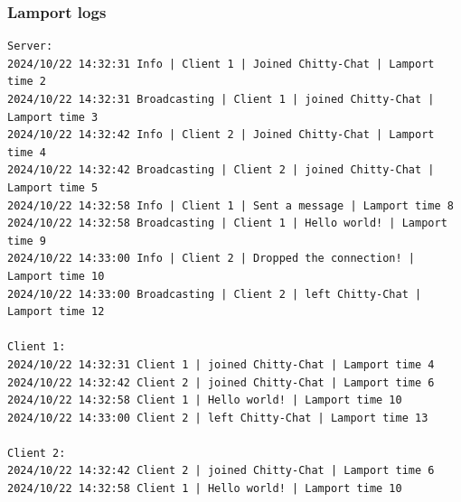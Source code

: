 \documentclass[a4paper,11pt]{article}
\begin{document}
\subsubsection*{Lamport logs}
\begin{lstlisting}[basicstyle=\ttfamily\footnotesize]
Server:
2024/10/22 14:32:31 Info | Client 1 | Joined Chitty-Chat | Lamport time 2
2024/10/22 14:32:31 Broadcasting | Client 1 | joined Chitty-Chat | Lamport time 3
2024/10/22 14:32:42 Info | Client 2 | Joined Chitty-Chat | Lamport time 4
2024/10/22 14:32:42 Broadcasting | Client 2 | joined Chitty-Chat | Lamport time 5
2024/10/22 14:32:58 Info | Client 1 | Sent a message | Lamport time 8
2024/10/22 14:32:58 Broadcasting | Client 1 | Hello world! | Lamport time 9
2024/10/22 14:33:00 Info | Client 2 | Dropped the connection! | Lamport time 10
2024/10/22 14:33:00 Broadcasting | Client 2 | left Chitty-Chat | Lamport time 12

Client 1:
2024/10/22 14:32:31 Client 1 | joined Chitty-Chat | Lamport time 4
2024/10/22 14:32:42 Client 2 | joined Chitty-Chat | Lamport time 6
2024/10/22 14:32:58 Client 1 | Hello world! | Lamport time 10
2024/10/22 14:33:00 Client 2 | left Chitty-Chat | Lamport time 13

Client 2:
2024/10/22 14:32:42 Client 2 | joined Chitty-Chat | Lamport time 6
2024/10/22 14:32:58 Client 1 | Hello world! | Lamport time 10
\end{lstlisting}
\end{document}
